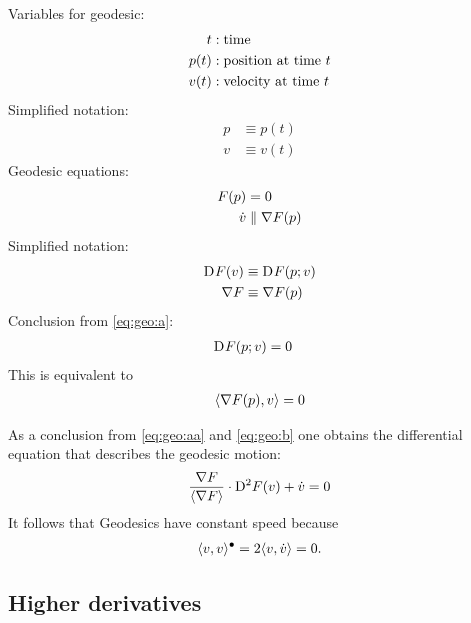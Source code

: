 Variables for geodesic:
\begin{subequations}
\begin{align}
t  &:  \text{time}\\
p( t )  &:  \text{position at time $ t $}\\
v( t )  &:  \text{velocity at time $ t $}
\end{align}
\end{subequations}
Simplified notation:
\begin{subequations}
\begin{align}
p  &\equiv  p( t )\\
v  &\equiv  v( t )
\end{align}
\end{subequations}
Geodesic equations:
\begin{subequations}
\label{eq:geo}
\begin{align}
F( p )  &=  0
\label{eq:geo:a}\\
\dot{ v }  &\parallel  \nabla F ( p )
\label{eq:geo:b}
\end{align}
\end{subequations}
Simplified notation:
\begin{subequations}
\begin{align}
\mathrm{D}^{  } F ( v )  &\equiv  \mathrm{D}^{  } F ( p; v )\\
\nabla F          &\equiv  \nabla F ( p )
\end{align}
\end{subequations}
Conclusion from \eqref{eq:geo:a}:
\begin{align}
\mathrm{D}^{  } F ( p; v )  &=  0
\label{eq:geo:aa}
\end{align}
This is equivalent to
\begin{align}
\langle  \nabla F ( p ) ,  v  \rangle  =  0
\end{align}

As a conclusion from \eqref{eq:geo:aa} and \eqref{eq:geo:b}
one obtains the differential equation that describes the geodesic motion:
\begin{align}
    \frac{ \nabla F  }{ \langle  \nabla F   \rangle } \cdot \mathrm{D}^{  2  } F ( v )
    +
    \dot{ v }
    =
    0
    \label{def:cf}
\end{align}
It follows that Geodesics have constant speed because
\begin{align}
    \langle  v ,  v  \rangle^\bullet  =  2 \langle  v ,  \dot{ v }  \rangle  =  0 .
\end{align}


\subsection{Higher derivatives}


